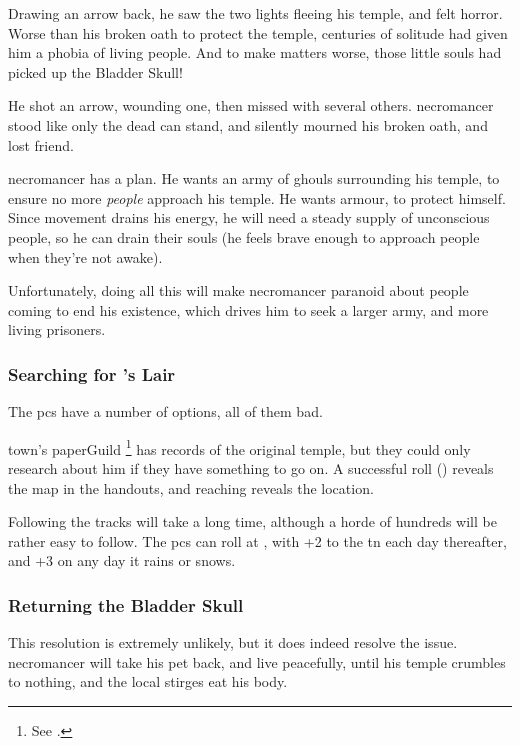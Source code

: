 \begin{exampletext}
  Drawing an arrow back, he saw the two lights fleeing his temple, and felt horror.
  Worse than his broken oath to protect the temple, centuries of solitude had given him a phobia of living people.
  And to make matters worse, those little souls had picked up the Bladder Skull!

  He shot an arrow, wounding one, then missed with several others.
  \Gls{necromancer} stood like only the dead can stand, and silently mourned his broken oath, and lost friend.

\end{exampletext}

\noindent
\Gls{necromancer} has a plan.
He wants an army of ghouls surrounding his temple, to ensure no more \emph{people} approach his temple.
He wants armour, to protect himself.
Since movement drains his energy, he will need a steady supply of unconscious people, so he can drain their souls (he feels brave enough to approach people when they're not awake).

Unfortunately, doing all this will make \gls{necromancer} paranoid about people coming to end his existence, which drives him to seek a larger army, and more living prisoners.

\subsubsection{Searching for 's Lair}
\label{huntingNecro}
The \glspl{pc} have a number of options, all of them bad.

\Gls{town}'s \gls{paperGuild}%
\footnote{See .}
has records of the original temple, but they could only research about him if they have something to go on.
A successful  roll (\tn[12]) reveals the map in the handouts, and reaching \tn[13] reveals the location.

Following the tracks will take a long time, although a horde of hundreds will be rather easy to follow.
The \glspl{pc} can roll  at \tn[5], with +2 to the \gls{tn} each day thereafter, and +3 on any day it rains or snows.

\subsubsection{Returning the Bladder Skull}

This resolution is extremely unlikely, but it does indeed resolve the issue.
\Gls{necromancer} will take his pet back, and live peacefully, until his temple crumbles to nothing, and the local stirges eat his body.

